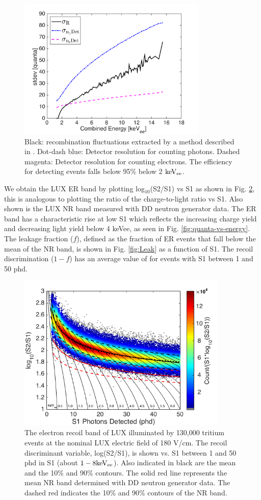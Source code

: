 \begin{figure}[h!]\centering
\includegraphics[width=90mm]{fig/recomb_flucs.png}
\caption{Black: recombination fluctuations extracted by a method described in \cite{Dobi_Thesis}. Dot-dash blue: Detector resolution for counting photons. Dashed magenta: Detector resolution for counting electrons. The efficiency for detecting events falls below 95\% below 2 $\rm keV_{ee}$.}
\label{fig:recomb-flucs}
\end{figure}

We obtain the LUX ER band by plotting log$_{10}$(S2/S1) vs S1 as shown in Fig. \ref{fig:ER_band}, this is analogous to plotting the ratio of the charge-to-light ratio vs S1. Also shown is the LUX NR band measured with DD neutron generator data. The ER band has a characteristic rise at low S1 which reflects the increasing charge yield and decreasing light yield below 4 keVee, as seen in Fig. \ref{fig:quanta-vs-energy}. The leakage fraction ($f$), defined as the fraction of ER events that fall below the mean of the NR band, is shown in Fig. \ref{fig:Leak} as a function of S1. The recoil discrimination ($1-f$) has an average value of  for events with S1 between 1 and 50 phd.

\begin{figure}[h!]\centering
\includegraphics[width=100mm]{fig/CH3T_ER_Band.png}
\caption{The electron recoil band of LUX illuminated by 130,000 tritium events at the nominal LUX electric field of 180 V/cm.  The recoil discriminant variable, log(S2/S1), is shown vs. S1 between 1 and 50 phd in S1 (about $\rm1-8 keV_{ee}$). Also indicated in black are the mean and the 10\% and 90\% contours. The solid red line represents the mean NR band determined with DD neutron generator data. The dashed red indicates the 10\% and 90\% contours of the NR band.}
\label{fig:ER_band}
\end{figure}

